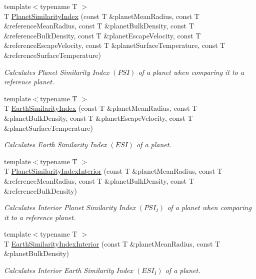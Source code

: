 \begin{DoxyCompactItemize}
{\footnotesize template$<$typename T $>$ }\\T \mbox{\hyperlink{group___e_g_x_phys-_planet_criteria_ga62e8b781c301df60bd04af3183a965eb}{Planet\+Similarity\+Index}} (const T \&planet\+Mean\+Radius, const T \&reference\+Mean\+Radius, const T \&planet\+Bulk\+Density, const T \&reference\+Bulk\+Density, const T \&planet\+Escape\+Velocity, const T \&reference\+Escape\+Velocity, const T \&planet\+Surface\+Temperature, const T \&reference\+Surface\+Temperature)
\begin{DoxyCompactList}\small\item\em Calculates Planet Similarity Index $(PSI)$ of a planet when comparing it to a reference planet. \end{DoxyCompactList}\item 
{\footnotesize template$<$typename T $>$ }\\T \mbox{\hyperlink{group___e_g_x_phys-_planet_criteria_ga4b86397b1c839c49ac599d49fda207d4}{Earth\+Similarity\+Index}} (const T \&planet\+Mean\+Radius, const T \&planet\+Bulk\+Density, const T \&planet\+Escape\+Velocity, const T \&planet\+Surface\+Temperature)
\begin{DoxyCompactList}\small\item\em Calculates Earth Similarity Index $(ESI)$ of a planet. \end{DoxyCompactList}\item 
{\footnotesize template$<$typename T $>$ }\\T \mbox{\hyperlink{group___e_g_x_phys-_planet_criteria_ga6dc06a1a8baf6e132abed51fcf410c7f}{Planet\+Similarity\+Index\+Interior}} (const T \&planet\+Mean\+Radius, const T \&reference\+Mean\+Radius, const T \&planet\+Bulk\+Density, const T \&reference\+Bulk\+Density)
\begin{DoxyCompactList}\small\item\em Calculates Interior Planet Similarity Index $(PSI_I)$ of a planet when comparing it to a reference planet. \end{DoxyCompactList}\item 
{\footnotesize template$<$typename T $>$ }\\T \mbox{\hyperlink{group___e_g_x_phys-_planet_criteria_ga699bcc2f17b8855eaa856595d8032f61}{Earth\+Similarity\+Index\+Interior}} (const T \&planet\+Mean\+Radius, const T \&planet\+Bulk\+Density)
\begin{DoxyCompactList}\small\item\em Calculates Interior Earth Similarity Index $(ESI_I)$ of a planet. \end{DoxyCompactList}\item 

\end{DoxyCompactItemize}
